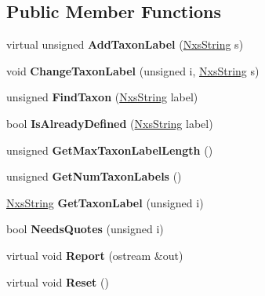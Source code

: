 \subsection*{Public Member Functions}
\begin{DoxyCompactItemize}
\item 
\hypertarget{classNxsTaxaBlock_a30181a6a7279c6fcbbaff0bbc0b7b52d}{
virtual unsigned {\bfseries AddTaxonLabel} (\hyperlink{classNxsString}{NxsString} s)}
\label{classNxsTaxaBlock_a30181a6a7279c6fcbbaff0bbc0b7b52d}

\item 
\hypertarget{classNxsTaxaBlock_aebf194e4a18ed394d390bf40c356a809}{
void {\bfseries ChangeTaxonLabel} (unsigned i, \hyperlink{classNxsString}{NxsString} s)}
\label{classNxsTaxaBlock_aebf194e4a18ed394d390bf40c356a809}

\item 
\hypertarget{classNxsTaxaBlock_a1b214b4f3abbd5a0834ae2f4b2dc3e91}{
unsigned {\bfseries FindTaxon} (\hyperlink{classNxsString}{NxsString} label)}
\label{classNxsTaxaBlock_a1b214b4f3abbd5a0834ae2f4b2dc3e91}

\item 
\hypertarget{classNxsTaxaBlock_a0584cfe7dba6c10b8d09292a0cf9cdd2}{
bool {\bfseries IsAlreadyDefined} (\hyperlink{classNxsString}{NxsString} label)}
\label{classNxsTaxaBlock_a0584cfe7dba6c10b8d09292a0cf9cdd2}

\item 
\hypertarget{classNxsTaxaBlock_a81de8995268dbcab73a400762778e743}{
unsigned {\bfseries GetMaxTaxonLabelLength} ()}
\label{classNxsTaxaBlock_a81de8995268dbcab73a400762778e743}

\item 
\hypertarget{classNxsTaxaBlock_aa40174941ba01275db4f9d67fb03dcdf}{
unsigned {\bfseries GetNumTaxonLabels} ()}
\label{classNxsTaxaBlock_aa40174941ba01275db4f9d67fb03dcdf}

\item 
\hypertarget{classNxsTaxaBlock_a52342eda06e07b8eb38f9c5a8bad8cba}{
\hyperlink{classNxsString}{NxsString} {\bfseries GetTaxonLabel} (unsigned i)}
\label{classNxsTaxaBlock_a52342eda06e07b8eb38f9c5a8bad8cba}

\item 
\hypertarget{classNxsTaxaBlock_a8dd12e868709d36640456c5b59983f8a}{
bool {\bfseries NeedsQuotes} (unsigned i)}
\label{classNxsTaxaBlock_a8dd12e868709d36640456c5b59983f8a}

\item 
\hypertarget{classNxsTaxaBlock_a0b0fd6be375b3bc6f14603da640c7659}{
virtual void {\bfseries Report} (ostream \&out)}
\label{classNxsTaxaBlock_a0b0fd6be375b3bc6f14603da640c7659}

\item 
\hypertarget{classNxsTaxaBlock_a9787a850ce00e40428696b93b1669020}{
virtual void {\bfseries Reset} ()}
\label{classNxsTaxaBlock_a9787a850ce00e40428696b93b1669020}

\end{DoxyCompactItemize}
